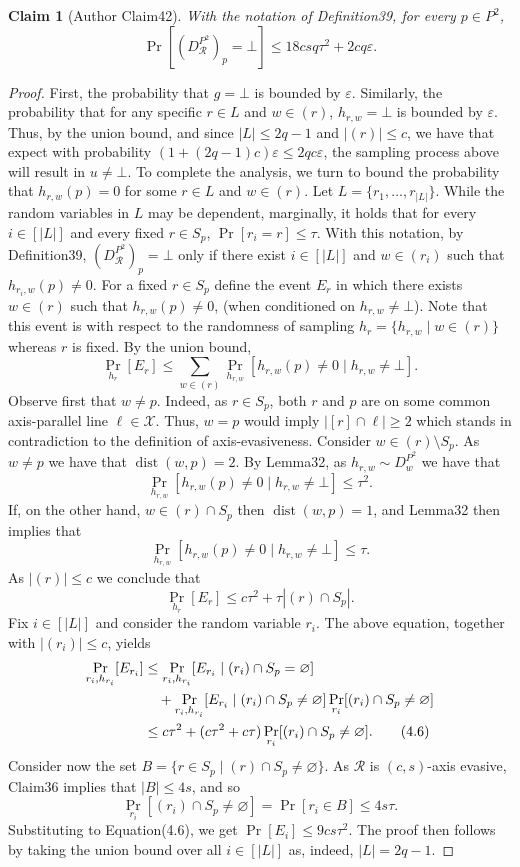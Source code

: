 \documentclass[10pt,a4paper]{article}
\newtheorem{ntclaim}[nttheorem]{Claim}
\begin{document}
\begin{ntclaim}[Author Claim42]
With the notation of Definition39, for every $p\in P^2$,
\[\Pr[(D_{\mathcal R}^{P^2})_p=\bot]\leq18csq\tau^2+2cq\varepsilon.\]
\end{ntclaim}
\begin{proof}
First, the probability that $g=\bot$ is bounded by $\varepsilon$. Similarly, the probability that for any specific $r\in L$ and $w\in(r)$, $h_{r,w}=\bot$ is bounded by $\varepsilon$. Thus, by the union bound, and since $|L|\leq2q-1$ and $|(r)|\leq c$, we have that expect with probability $(1+(2q-1)c)\varepsilon\leq2qc\varepsilon$, the sampling process above will result in $u\ne\bot$.
To complete the analysis, we turn to bound the probability that $h_{r,w}(p)=0$ for some $r\in L$ and $w\in(r)$. Let $L=\{r_1,\ldots,r_{|L|}\}$. While the random variables in $L$ may be dependent, marginally, it holds that for every $i\in[|L|]$ and every fixed $r\in S_p$, $\Pr[r_i=r]\leq\tau$. With this notation, by Definition39, $(D_{\mathcal R}^{P^2})_p=\bot$ only if there exist $i\in[|L|]$ and $w\in(r_i)$ such that $h_{r_i,w}(p)\ne0$.
For a fixed $r\in S_p$ define the event $E_r$ in which there exists $w\in(r)$ such that $h_{r,w}(p)\ne0$, (when conditioned on $h_{r,w}\ne\bot$). Note that this event is with respect to the randomness of sampling $h_r=\{h_{r,w}\mid w\in(r)\}$ whereas $r$ is fixed. By the union bound,
\[\Pr_{h_r}[E_r]\leq\sum_{w\in(r)}\Pr_{h_{r,w}}[h_{r,w}(p)\ne0\mid h_{r,w}\ne\bot].\]
Observe first that $w\ne p$. Indeed, as $r\in S_p$, both $r$ and $p$ are on some common axis-parallel line $\ell\in\mathcal X$. Thus, $w=p$ would imply $|[r]\cap\ell|\geq2$ which stands in contradiction to the definition of axis-evasiveness. Consider $w\in(r)\setminus S_p$. As $w\ne p$ we have that $\operatorname{dist}(w,p)=2$. By Lemma32, as $h_{r,w}\sim D_w^{P^2}$ we have that
\[\Pr_{h_{r,w}}[h_{r,w}(p)\ne0\mid h_{r,w}\ne\bot]\leq\tau^2.\]
If, on the other hand, $w\in(r)\cap S_p$ then $\operatorname{dist}(w,p)=1$, and Lemma32 then implies that
\[\Pr_{h_{r,w}}[h_{r,w}(p)\ne0\mid h_{r,w}\ne\bot]\leq\tau.\]
As $|(r)|\leq c$ we conclude that
\[\Pr_{h_r}[E_r]\leq c\tau^2+\tau|(r)\cap S_p|.\]
Fix $i\in[|L|]$ and consider the random variable $r_i$. The above equation, together with $|(r_i)|\leq c$, yields
\begin{align}\Pr_{r_i,h_{r_i}}[E_{r_i}]&\leq\Pr_{r_i,h_{r_i}}[E_{r_i}\mid(r_i)\cap S_p=\varnothing]\notag\\&\quad+\Pr_{r_i,h_{r_i}}[E_{r_i}\mid(r_i)\cap S_p\ne\varnothing]\Pr_{r_i}[(r_i)\cap S_p\ne\varnothing]\notag\\&\leq c\tau^2+(c\tau^2+c\tau)\Pr_{r_i}[(r_i)\cap S_p\ne\varnothing].\tag{4.6}\end{align}
Consider now the set $B=\{r\in S_p\mid(r)\cap S_p\ne\varnothing\}$. As $\mathcal R$ is $(c,s)$-axis evasive, Claim36 implies that $|B|\leq4s$, and so
\[\Pr_{r_i}[(r_i)\cap S_p\ne\varnothing]=\Pr[r_i\in B]\leq4s\tau.\]
Substituting to Equation(4.6), we get $\Pr[E_i]\leq9cs\tau^2$. The proof then follows by taking the union bound over all $i\in[|L|]$ as, indeed, $|L|=2q-1$.
\end{proof}
\end{document}
